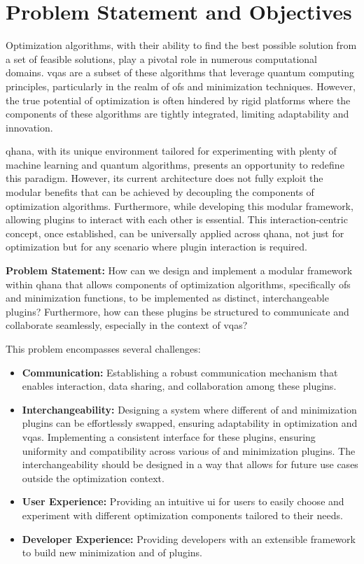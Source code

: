 \documentclass[
  a4paper,  %
  twoside,  %
  bibliography=totoc,
  headsepline,
  cleardoublepage=empty,
  parskip=half,
  draft=false
]{scrbook}
\begin{document}
\chapter{Problem Statement and Objectives}
\label{chap:problem}

Optimization algorithms, with their ability to find the best possible solution from a set of feasible solutions, play a pivotal role in numerous computational domains.
\glspl{vqa} are a subset of these algorithms that leverage quantum computing principles, particularly in the realm of \glspl{of} and minimization techniques.
However, the true potential of optimization is often hindered by rigid platforms where the components of these algorithms are tightly integrated, limiting adaptability and innovation.

\gls{qhana}, with its unique environment tailored for experimenting with plenty of machine learning and quantum algorithms, presents an opportunity to redefine this paradigm.
However, its current architecture does not fully exploit the modular benefits that can be achieved by decoupling the components of optimization algorithms.
Furthermore, while developing this modular framework, allowing plugins to interact with each other is essential.
This interaction-centric concept, once established, can be universally applied across \gls{qhana}, not just for optimization but for any scenario where plugin interaction is required.

\textbf{Problem Statement:}
How can we design and implement a modular framework within \gls{qhana} that allows components of optimization algorithms, specifically \glspl{of} and minimization functions, to be implemented as distinct, interchangeable plugins?
Furthermore, how can these plugins be structured to communicate and collaborate seamlessly, especially in the context of \glspl{vqa}?

This problem encompasses several challenges:

\begin{itemize}
    \item \textbf{Communication:} Establishing a robust communication mechanism that enables interaction, data sharing, and collaboration among these plugins.
    \item \textbf{Interchangeability:} Designing a system where different \gls{of} and minimization plugins can be effortlessly swapped, ensuring adaptability in optimization and \glspl{vqa}.
    Implementing a consistent interface for these plugins, ensuring uniformity and compatibility across various \gls{of} and minimization plugins.
    The interchangeability should be designed in a way that allows for future use cases outside the optimization context.
    \item \textbf{User Experience:} Providing an intuitive \gls{ui} for users to easily choose and experiment with different optimization components tailored to their needs.
    \item \textbf{Developer Experience:} Providing developers with an extensible framework to build new minimization and \gls{of} plugins.
  \end{itemize}
\end{document}
